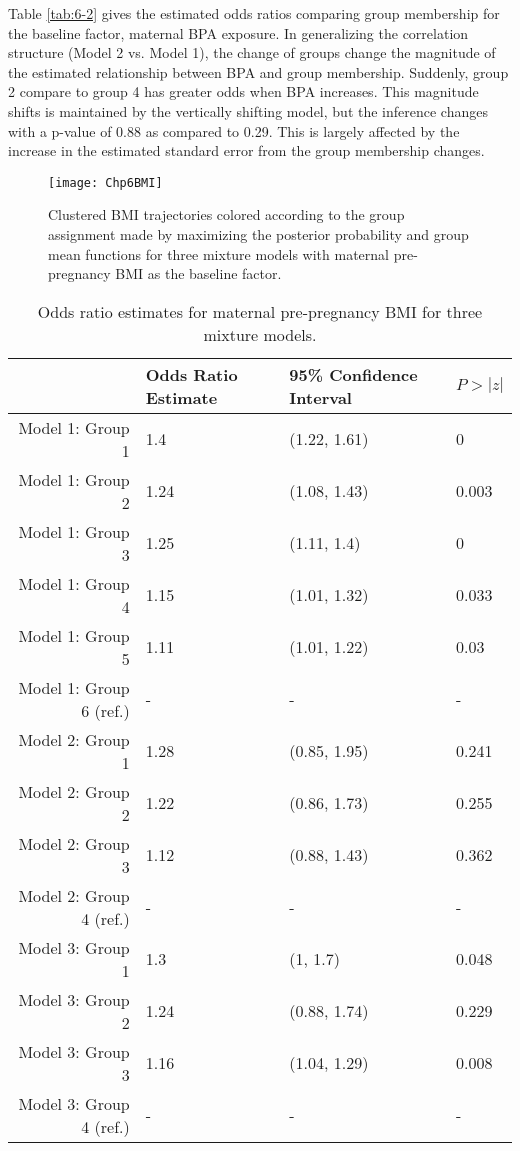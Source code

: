 Table \ref{tab:6-2} gives the estimated odds ratios comparing group membership for the baseline factor, maternal BPA exposure. In generalizing the correlation structure (Model 2 vs. Model 1), the change of groups change the magnitude of the estimated relationship between BPA and group membership. Suddenly, group 2 compare to group 4 has greater odds when BPA increases. This magnitude shifts is maintained by the vertically shifting model, but the inference changes with a p-value of 0.88 as compared to 0.29. This is largely affected by the increase in the estimated standard error from the group membership changes.

\begin{figure}[h]
\begin{center}
\texttt{[image: Chp6BMI]}
\end{center}
\label{fig:6-1}
\caption{Clustered BMI trajectories colored according to the group assignment made by maximizing the posterior probability and group mean functions for three mixture models with maternal pre-pregnancy BMI as the baseline factor.}
\end{figure}

\begin{table}[ht]
\begin{center}
\begin{tabular}{rlll}
  \hline
 & Odds Ratio Estimate & 95\% Confidence Interval & $P>|z|$ \\ 
  \hline
Model 1: Group  1 & 1.4 & (1.22, 1.61) & 0 \\ 
  Model 1: Group  2 & 1.24 & (1.08, 1.43) & 0.003 \\ 
  Model 1: Group  3 & 1.25 & (1.11, 1.4) & 0 \\ 
  Model 1: Group  4 & 1.15 & (1.01, 1.32) & 0.033 \\ 
  Model 1: Group  5 & 1.11 & (1.01, 1.22) & 0.03 \\ 
  Model 1: Group  6  (ref.) & - & - & - \\ 
  Model 2: Group  1 & 1.28 & (0.85, 1.95) & 0.241 \\ 
  Model 2: Group  2 & 1.22 & (0.86, 1.73) & 0.255 \\ 
  Model 2: Group  3 & 1.12 & (0.88, 1.43) & 0.362 \\ 
  Model 2: Group  4  (ref.) & - & - & - \\ 
  Model 3: Group  1 & 1.3 & (1, 1.7) & 0.048 \\ 
  Model 3: Group  2 & 1.24 & (0.88, 1.74) & 0.229 \\ 
  Model 3: Group  3 & 1.16 & (1.04, 1.29) & 0.008 \\ 
  Model 3: Group  4  (ref.) & - & - & - \\ 
   \hline
\end{tabular}
\caption{Odds ratio estimates for maternal pre-pregnancy BMI for three mixture models. }
\end{center}
\label{tab:6-1}
\end{table}

